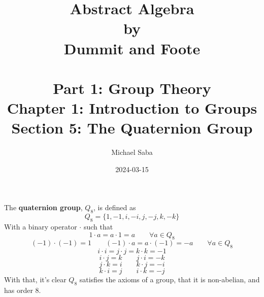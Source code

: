 \documentclass[12pt]{article}
\title{%
    \Huge Abstract Algebra \\
    \large by \\
    \Large Dummit and Foote \\~\\
    \huge Part 1: Group Theory \\
    \LARGE Chapter 1: Introduction to Groups \\
    \Large Section 5: The Quaternion Group
}
\date{2024-03-15}
\author{Michael Saba}
\begin{document}
    \maketitle
    \newpage
    \setlength{\parindent}{0pt}

    The \textbf{quaternion group}, $Q_8$, is defined as
    \[ Q_8 = \{ 1, -1, i, -i, j, -j, k, -k \} \]
    With a binary operator $\cdot$ such that
    \[ 1 \cdot a = a \cdot 1 = a \qquad \forall a \in Q_8  \]
    \[ (-1)\cdot(-1) = 1 \qquad (-1)\cdot a = a\cdot (-1) = -a
    \qquad \forall a \in Q_8 \]
    \[ i \cdot i = j \cdot j = k \cdot k = -1 \]
    \[ i \cdot j = k \qquad j \cdot i = -k \]
    \[ j \cdot k = i \qquad k \cdot j = -i \]
    \[ k \cdot i = j \qquad i \cdot k = -j \]
    With that,
    it's clear $Q_8$ satisfies the axioms of a group,
    that it is non-abelian,
    and has order $8$. \\

    
\end{document}
